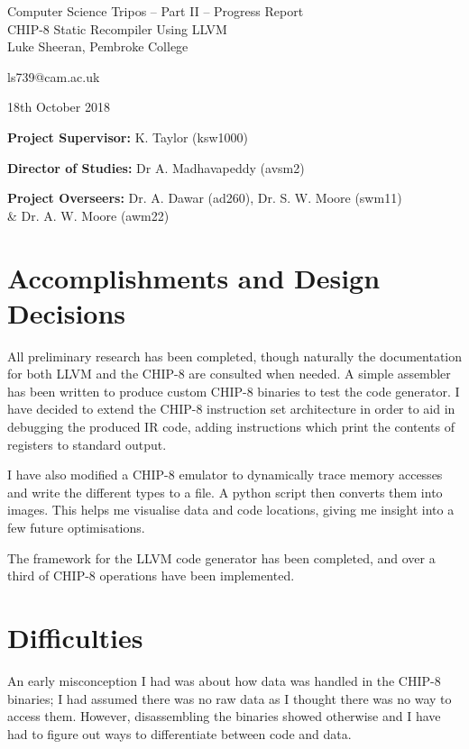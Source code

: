 \documentclass[12pt,a4paper,twoside]{article}
\begin{document}
\begin{center}
\Large
Computer Science Tripos -- Part II -- Progress Report\\[4mm]
\LARGE
CHIP-8 Static Recompiler Using LLVM\\[4mm]

\large
Luke Sheeran, Pembroke College

ls739@cam.ac.uk

18th October 2018
\end{center}

\vspace{5mm}

\textbf{Project Supervisor:} K. Taylor (ksw1000)

\textbf{Director of Studies:} Dr A. Madhavapeddy (avsm2)

\textbf{Project Overseers:} Dr. A. Dawar (ad260), Dr. S. W. Moore (swm11) \\\& Dr. A. W. Moore (awm22)



\section*{Accomplishments and Design Decisions}
All preliminary research has been completed, though naturally the documentation for both LLVM and the CHIP-8 are consulted when needed. A simple assembler has been written to produce custom CHIP-8 binaries to test the code generator. I have decided to extend the CHIP-8 instruction set architecture in order to aid in debugging the produced IR code, adding instructions which print the contents of registers to standard output.

I have also modified a CHIP-8 emulator to  dynamically trace memory accesses and write the different types to a file. A python script then converts them into images. This helps me visualise data and code locations, giving me insight into a few future optimisations.

The framework for the LLVM code generator has been completed, and over a third of CHIP-8 operations have been implemented.

\section*{Difficulties}
An early misconception I had was about how data was handled in the CHIP-8 binaries; I had assumed there was no raw data as I thought there was no way to access them. However, disassembling the binaries showed otherwise and I have had to figure out ways to differentiate between code and data.
\end{document}
